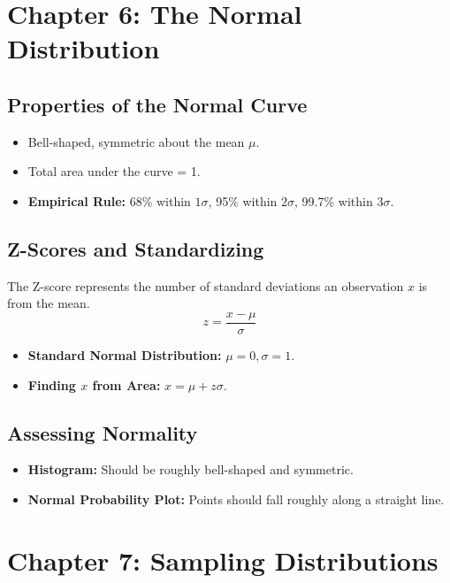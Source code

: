 \documentclass[11pt]{article}
\begin{document}
\section{Chapter 6: The Normal Distribution}
\subsection{Properties of the Normal Curve}
\begin{itemize}
    \item Bell-shaped, symmetric about the mean $\mu$.
    \item Total area under the curve = 1.
    \item \textbf{Empirical Rule:} 68\% within $1\sigma$, 95\% within $2\sigma$, 99.7\% within $3\sigma$.
\end{itemize}

\subsection{Z-Scores and Standardizing}
The Z-score represents the number of standard deviations an observation $x$ is from the mean.
\[ z = \frac{x - \mu}{\sigma} \]
\begin{itemize}
    \item \textbf{Standard Normal Distribution:} $\mu = 0, \sigma = 1$.
    \item \textbf{Finding $x$ from Area:} $x = \mu + z\sigma$.
\end{itemize}

\subsection{Assessing Normality}
\begin{itemize}
    \item \textbf{Histogram:} Should be roughly bell-shaped and symmetric.
    \item \textbf{Normal Probability Plot:} Points should fall roughly along a straight line.
\end{itemize}

\section{Chapter 7: Sampling Distributions}
\end{document}
